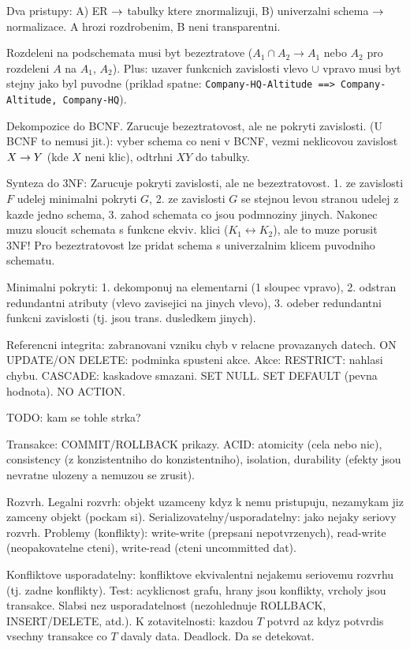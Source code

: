 Dva pristupy: A) ER $\rightarrow$ tabulky ktere znormalizuji, B) univerzalni schema
$\rightarrow$ normalizace.
A hrozi rozdrobenim, B neni transparentni.

Rozdeleni na podschemata musi byt bezeztratove ($A_1\cap A_2\rightarrow A_1$
nebo $A_2$ pro rozdeleni $A$ na $A_1$, $A_2$). Plus: uzaver funkcnich
zavislosti vlevo $\cup$ vpravo musi byt stejny jako byl puvodne
(priklad spatne: \verb#Company-HQ-Altitude ==> Company-Altitude, Company-HQ#).

Dekompozice do BCNF. Zarucuje bezeztratovost, ale ne pokryti zavislosti.
(U BCNF to nemusi jit.):
vyber schema co neni v BCNF, vezmi neklicovou zavislost $X\rightarrow Y$ (kde $X$
neni klic), odtrhni $XY$ do tabulky.

Synteza do 3NF: Zarucuje pokryti zavislosti, ale ne bezeztratovost.
1. ze zavislosti $F$ udelej minimalni pokryti $G$,
2. ze zavislosti $G$ se stejnou levou stranou udelej z kazde jedno schema,
3. zahod schemata co jsou podmnoziny jinych.
Nakonec muzu sloucit schemata s funkcne ekviv. klici ($K_1\leftrightarrow K_2$),
ale to muze porusit 3NF! Pro bezeztratovost lze pridat schema s univerzalnim
klicem puvodniho schematu.

Minimalni pokryti: 1. dekomponuj na elementarni (1 sloupec vpravo), 2. odstran
redundantni atributy (vlevo zavisejici na jinych vlevo), 3. odeber redundantni
funkcni zavislosti (tj. jsou trans. dusledkem jinych).

Referencni integrita: zabranovani vzniku chyb v relacne provazanych datech.
ON UPDATE/ON DELETE: podminka spusteni akce.
Akce: RESTRICT: nahlasi chybu. CASCADE: kaskadove smazani.
SET NULL. SET DEFAULT (pevna hodnota). NO ACTION.

TODO: kam se tohle strka?

Transakce: COMMIT/ROLLBACK prikazy.
ACID: atomicity (cela nebo nic), consistency (z konzistentniho do
konzistentniho), isolation, durability (efekty jsou nevratne ulozeny a nemuzou
se zrusit).

Rozvrh. Legalni rozvrh: objekt uzamceny kdyz k nemu pristupuju, nezamykam
jiz zamceny objekt (pockam si).
Serializovatelny/usporadatelny: jako nejaky seriovy rozvrh.
Problemy (konflikty): write-write (prepsani nepotvrzenych), read-write
(neopakovatelne cteni), write-read (cteni uncommitted dat).

Konfliktove usporadatelny: konfliktove ekvivalentni nejakemu seriovemu rozvrhu
(tj. zadne konflikty). Test: acyklicnost grafu, hrany jsou konflikty,
vrcholy jsou transakce. Slabsi nez usporadatelnost (nezohlednuje ROLLBACK,
INSERT/DELETE, atd.).
K zotavitelnosti: kazdou $T$ potvrd az kdyz potvrdis vsechny transakce co $T$
davaly data.
Deadlock. Da se detekovat.

